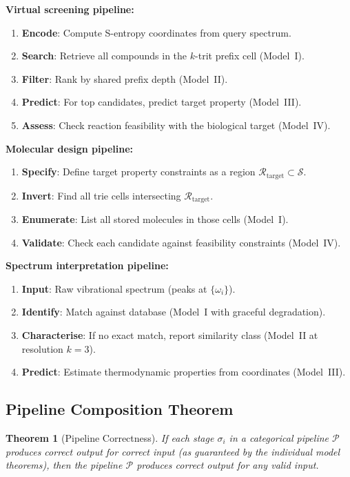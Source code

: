\documentclass[11pt,twocolumn,a4paper]{article}
\newtheorem{theorem}{Theorem}[section]
\theoremstyle{definition}
\theoremstyle{remark}
\newcommand{\Sspace}{\mathcal{S}}
\newcommand{\Pipeline}{\mathcal{P}}
\begin{document}
\textbf{Virtual screening pipeline:}
\begin{enumerate}[nosep]
\item \textbf{Encode}: Compute S-entropy coordinates from query spectrum.
\item \textbf{Search}: Retrieve all compounds in the $k$-trit prefix cell (Model~I).
\item \textbf{Filter}: Rank by shared prefix depth (Model~II).
\item \textbf{Predict}: For top candidates, predict target property (Model~III).
\item \textbf{Assess}: Check reaction feasibility with the biological target (Model~IV).
\end{enumerate}

\textbf{Molecular design pipeline:}
\begin{enumerate}[nosep]
\item \textbf{Specify}: Define target property constraints as a region $\mathcal{R}_{\mathrm{target}} \subset \Sspace$.
\item \textbf{Invert}: Find all trie cells intersecting $\mathcal{R}_{\mathrm{target}}$.
\item \textbf{Enumerate}: List all stored molecules in those cells (Model~I).
\item \textbf{Validate}: Check each candidate against feasibility constraints (Model~IV).
\end{enumerate}

\textbf{Spectrum interpretation pipeline:}
\begin{enumerate}[nosep]
\item \textbf{Input}: Raw vibrational spectrum (peaks at $\{\omega_i\}$).
\item \textbf{Identify}: Match against database (Model~I with graceful degradation).
\item \textbf{Characterise}: If no exact match, report similarity class (Model~II at resolution $k=3$).
\item \textbf{Predict}: Estimate thermodynamic properties from coordinates (Model~III).
\end{enumerate}

\subsection{Pipeline Composition Theorem}

\begin{theorem}[Pipeline Correctness]
\label{thm:pipeline_correct}
If each stage $\sigma_i$ in a categorical pipeline $\Pipeline$ produces correct output for correct input (as guaranteed by the individual model theorems), then the pipeline $\Pipeline$ produces correct output for any valid input.
\end{theorem}
\end{document}
